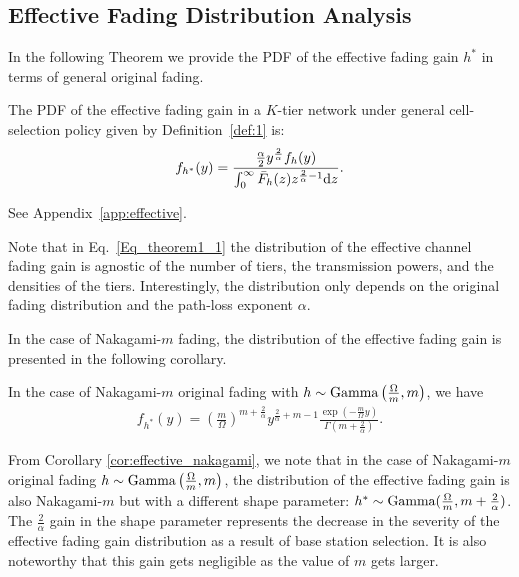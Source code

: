 \documentclass[final]{IEEEtran}
\begin{document}
\subsection{Effective Fading Distribution Analysis}
In the following Theorem we provide the PDF of the effective fading gain $h^*$ in terms of general original fading.
\begin{theorem} \label{thm:effective_general}
The PDF of the effective fading gain in a $K$-tier network under general cell-selection policy given by Definition~\ref{def:1} is: 
\begin{align}
\label{Eq_theorem1_1}
f_{h^*}(y)=\frac{\frac{\alpha}{2} {y}^{\frac{2}{\alpha}} f_{h}(y)}{\int_{0}^{\infty}\bar{F}_h(z)z^{\frac{2}{\alpha}-1}{\rm d}z}.
\end{align}
\end{theorem}
\begin{IEEEproof}
See Appendix~\ref{app:effective}.
\end{IEEEproof}
\begin{remark} \label{rem:alpha_fading_dist}
Note that in Eq.~\ref{Eq_theorem1_1} the distribution of the effective channel fading gain is agnostic of the number of tiers, the transmission powers, and the densities of the tiers. Interestingly, the distribution only depends on the original fading distribution and the path-loss exponent $\alpha$. %
\end{remark}
In the case of Nakagami-$m$ fading, the distribution of the effective fading gain is presented in the following corollary.
\begin{cor}\label{cor:effective_nakagami}
In the case of Nakagami-$m$ original fading with $h\sim \textnormal{Gamma}\left(\frac{\Omega}{m},m\right)$, we have
\begin{align}
\label{Eq_cor2_1}
f_{h^*}(y)=\left(\frac{m}{\Omega}\right)^{m+\frac{2}{\alpha}}y^{\frac{2}{\alpha}+m-1}\frac{\exp(-\frac{m}{\Omega}y)}{{\Gamma(m+\frac{2}{\alpha})}}.
\end{align}
\end{cor}
\begin{remark} \label{rem:m_effect}
From Corollary \ref{cor:effective_nakagami}, we note that in the case of Nakagami-$m$ original fading $h\sim \textnormal{Gamma}\left(\frac{\Omega}{m},m\right)$, the distribution of the effective fading gain is also Nakagami-$m$ but with a different shape parameter: $h^*\sim \textnormal{Gamma}(\frac{\Omega}{m},m+\frac{2}{\alpha})$. The $\frac{2}{\alpha}$ gain in the shape parameter represents the decrease in the severity of the effective fading gain distribution as a result of base station selection. It is also noteworthy that this gain gets negligible as the value of $m$ gets larger.
\end{remark}
\end{document}
